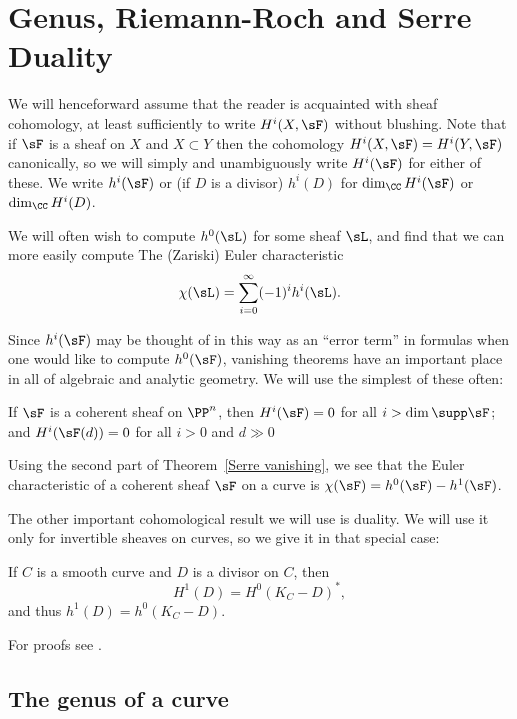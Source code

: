 \section{Genus, Riemann-Roch and Serre Duality}

We will henceforward assume that the reader is acquainted with sheaf cohomology, at least sufficiently to write
$H^i(X, \sF)$ without blushing. Note that if $\sF$ is a sheaf on $X$ and $X\subset Y$ then the cohomology  $H^i(X, \sF) = H^i(Y,\sF)$ canonically, so we will
simply and unambiguously write $H^i(\sF)$ for either of these. 
We write $h^i(\sF)$ or (if $D$ is a divisor) $h^{i}(D)$ for $\dim_{\CC}H^i(\sF)$ or $\dim_{\CC}H^i(D)$. 

We will often wish to compute $h^0(\sL)$ for some
sheaf $\sL$, and find that we can more easily compute 
The (Zariski) Euler characteristic 
$$
\chi(\sL) = \sum_{i=0}^\infty (-1)^ih^i(\sL).
$$

Since $h^{i}(\sF)$ may be thought of in this way as an ``error term'' in formulas when one would like to compute
$h^{0}(\sF)$,  vanishing theorems have an important place in all of algebraic and analytic geometry. We will use the simplest of these often:


\begin{theorem}\label{Serre vanishing} If $\sF$ is a coherent sheaf on $\PP^n$, then
$H^{i}(\sF)= 0$ for all $i>\dim \supp \sF$; and  $H^{i}(\sF(d))= 0$ for all $i>0$ and $d\gg 0$  
\end{theorem}

Using the second part of Theorem~\ref{Serre vanishing}, we see that the Euler characteristic of a coherent sheaf $\sF$ on a curve
 is  $\chi(\sF) = h^0(\sF) - h^1(\sF)$.
 
 The other important cohomological result we will use is duality. We will use it only for invertible sheaves on curves, so we give it in
 that special case:
 
\begin{theorem}\label{sd}
If $C$ is a smooth curve and $D$ is a divisor on $C$, then
$$
H^1(D) =H^0(K_C-D)^*,
$$
and thus $h^1(D) = h^0(K_C-D)$.
\end{theorem}

For proofs see \cite[Theorem III.5.2 and III.7.6]{H}. 

\subsection{The genus of a curve}


